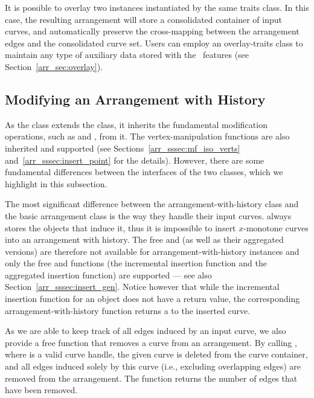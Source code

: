It is possible to overlay two  instances 
instantiated by the same traits class. In this case, the resulting 
arrangement will store a consolidated container of input curves, and 
automatically preserve the cross-mapping between the arrangement edges 
and the consolidated curve set. Users can employ an overlay-traits class
to maintain any type of auxiliary data stored with the \dcel\ features
(see Section~\ref{arr_sec:overlay}).

\subsection{Modifying an Arrangement with History}
\label{arr_ssec:modif_traverse}
%
As the  class extends the 
class, it inherits the fundamental modification operations, such as 
 and , from it. The vertex-manipulation functions
are also inherited and supported (see Sections~\ref{arr_sssec:mf_iso_verts}
and~\ref{arr_sssec:insert_point} for the details). However, there are some 
fundamental differences between the interfaces of the two classes, which we
highlight in this subsection.

The most significant difference between the arrangement-with-history class
and the basic arrangement class is the way they handle their input curves.
 always stores the  objects
that induce it, thus it is impossible to insert $x$-monotone curves into
an arrangement with history. The free 
and  (as well as their aggregated versions)
are therefore not available for arrangement-with-history instances
and only the free  and  functions
(the incremental insertion function and the aggregated insertion function)
are supported --- see also Section~\ref{arr_sssec:insert_gen}. Notice however
that while the incremental insertion function  for
an  object  does not have a return value,
the corresponding arrangement-with-history function returns a
 to the inserted curve.

As we are able to keep track of all edges induced by an input curve, we also
provide a free function that removes a curve from an arrangement. By calling
, where  is a valid curve handle, the given curve
is deleted from the curve container, and all edges induced solely by
this curve (i.e., excluding overlapping edges) are removed from the 
arrangement. The function returns the number of edges that have been removed.

